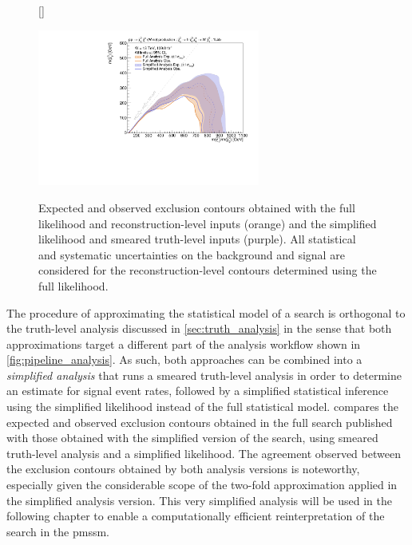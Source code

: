 \begin{figure}
[\FBwidth]
{\caption{Expected and observed exclusion contours obtained with the full likelihood and reconstruction-level inputs (orange) and the simplified likelihood and smeared truth-level inputs (purple). All statistical and systematic uncertainties on the background and signal are considered for the reconstruction-level contours determined using the full likelihood.}\label{fig:exclusion_1Lbb_truthInput_BkgSignal_700_200_noLabel}}
{\includegraphics[width=0.65\textwidth]{exclusion_1Lbb_truthInput_BkgSignal_700_200_noLabel}}
\end{figure}

The procedure of approximating the statistical model of a search is orthogonal to the truth-level analysis discussed in \cref{sec:truth_analysis} in the sense that both approximations target a different part of the analysis workflow shown in \cref{fig:pipeline_analysis}.
As such, both approaches can be combined into a \textit{simplified analysis} that runs a smeared truth-level analysis in order to determine an estimate for signal event rates, followed by a simplified statistical inference using the simplified likelihood instead of the full statistical model.
 compares the expected and observed exclusion contours obtained in the full \onelepton search published with those obtained with the simplified version of the search, using smeared truth-level analysis and a simplified likelihood.
The agreement observed between the exclusion contours obtained by both analysis versions is noteworthy, especially given the considerable scope of the two-fold approximation applied in the simplified analysis version.
This very simplified analysis will be used in the following chapter to enable a computationally efficient reinterpretation of the \onelepton search in the \gls{pmssm}.

